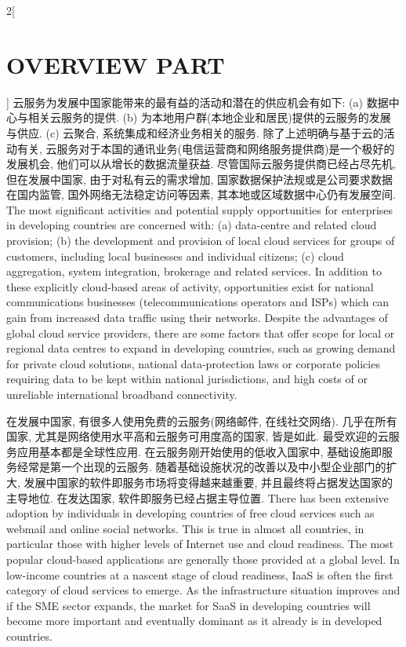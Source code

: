 \documentclass[a4paper, UTF8, 12pt]{article}
\begin{document}
\begin{paracol}{2}[\section{OVERVIEW PART\uppercase\expandafter{}}]
    \switchcolumn*
    云服务为发展中国家能带来的最有益的活动和潜在的供应机会有如下: (a) 数据中心与相关云服务的提供. (b) 为本地用户群(本地企业和居民)提供的云服务的发展与供应. (c) 云聚合, 系统集成和经济业务相关的服务. 除了上述明确与基于云的活动有关, 云服务对于本国的通讯业务(电信运营商和网络服务提供商)是一个极好的发展机会, 他们可以从增长的数据流量获益. 尽管国际云服务提供商已经占尽先机, 但在发展中国家, 由于对私有云的需求增加, 国家数据保护法规或是公司要求数据在国内监管, 国外网络无法稳定访问等因素, 其本地或区域数据中心仍有发展空间.
    \switchcolumn
    The most significant activities and potential supply opportunities for enterprises in developing countries are concerned with: (a) data-centre and related cloud provision; (b) the development and provision of local cloud services for groups of customers, including local businesses and individual citizens; (c) cloud aggregation, system integration, brokerage and related services. In addition to these explicitly cloud-based areas of activity, opportunities exist for national communications businesses (telecommunications operators and ISPs) which can gain from increased data traffic using their networks. Despite the advantages of global cloud service providers, there are some factors that offer scope for local or regional data centres to expand in developing countries, such as growing demand for private cloud solutions, national data-protection laws or corporate policies requiring data to be kept within national jurisdictions, and high costs of or unreliable international broadband connectivity. 

    \switchcolumn*
    在发展中国家, 有很多人使用免费的云服务(网络邮件, 在线社交网络). 几乎在所有国家, 尤其是网络使用水平高和云服务可用度高的国家, 皆是如此. 最受欢迎的云服务应用基本都是全球性应用. 在云服务刚开始使用的低收入国家中, 基础设施即服务经常是第一个出现的云服务. 随着基础设施状况的改善以及中小型企业部门的扩大, 发展中国家的软件即服务市场将变得越来越重要, 并且最终将占据发达国家的主导地位. 在发达国家, 软件即服务已经占据主导位置.
    \switchcolumn
    There has been extensive adoption by individuals in developing countries of free cloud services such as webmail and online social networks. This is true in almost all countries, in particular those with higher levels of Internet use and cloud readiness. The most popular cloud-based applications are generally those provided at a global level. In low-income countries at a nascent stage of cloud readiness, IaaS is often the first category of cloud services to emerge. As the infrastructure situation improves and if the SME sector expands, the market for SaaS in developing countries will become more important and eventually dominant as it already is in developed countries.

\end{paracol}
\end{document}
